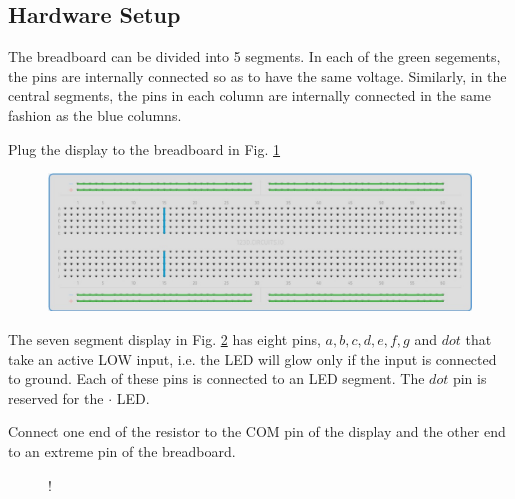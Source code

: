 \subsection{Hardware Setup}
The breadboard can be divided into 5 segments.  In each of the green segements, the pins are internally connected so as to have the same voltage.  Similarly, in the central segments, the pins in each column  are internally connected in the same fashion as the blue columns. 

\begin{problem}
	Plug the display to the breadboard in Fig. \ref{fig:breadboard}
\end{problem}
\begin{figure}[!h]
\begin{center}
\includegraphics[width=\columnwidth]{./figs/breadboard}
\end{center}
\caption{}
\label{fig:breadboard}
\end{figure}

The seven segment display in Fig. \ref{fig:sevenseg} has eight pins, $a, b, c, d, e, f, g$ and $dot$ that take an active LOW input, i.e.  the LED will glow only if the input is connected to ground.  Each of these pins is connected to an LED segment.  The $dot$ pin is  reserved for the $\cdot$ LED.  

%

\begin{problem}
	Connect one end of the resistor to the COM pin of the display and the other end to an extreme pin of the breadboard.	
\end{problem}
%
%
%
\begin{figure}[!h]
\begin{center}
 {!} {

}
\end{center}
\caption{}
\label{fig:sevenseg}
\end{figure}

